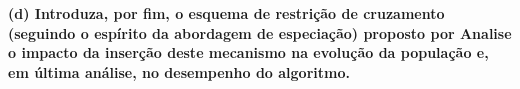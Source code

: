 \documentclass[a4paper, 12pt]{article}
\begin{document}
\textbf{(d) Introduza, por fim, o esquema de restrição de cruzamento (seguindo o espírito da abordagem de especiação) proposto por \cite{deb1989genetic} Analise o impacto da inserção deste mecanismo na evolução da população e, em última análise, no desempenho do algoritmo.}

\clearpage





 
\end{document}

